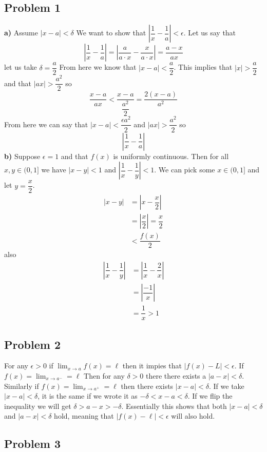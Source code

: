 \documentclass[12pt]{article}
\begin{document}
\subsection*{Problem 1}
\textbf{a)} Assume $|x - a| < \delta$ We want to show that $\left|\dfrac{1}{x} - \dfrac{1}{a} \right| < \epsilon$. Let us say that
\[ \left|\dfrac{1}{x} - \dfrac{1}{a} \right| = \left|\dfrac{a}{a \cdot x} - \dfrac{x}{a \cdot x} \right| = \dfrac{a - x}{ax} \]
let us take $\delta = \dfrac{a}{2}$ From here we know that $|x - a| < \dfrac{a}{2}$. This implies that $|x| > \dfrac{a}{2}$ and that $|ax| > \dfrac{a^2}{2}$ so
\[  \dfrac{x-a}{ax} < \dfrac{x - a}{\dfrac{a^2}{2}} = \dfrac{2(x - a)}{a^2}\]
From here we can say that $|x- a| < \dfrac{\epsilon a^2}{2}$ and $|ax| > \dfrac{a^2}{2}$ so
\[ \left|  \dfrac{1}{x} - \dfrac{1}{a} \right| \]
\textbf{b) } Suppose $\epsilon = 1$ and that $f(x)$ is uniformly continuous. Then for all $x,y \in (0,1]$ we have $|x-y| < 1$ and $|\dfrac{1}{x} - \dfrac{1}{y}| < 1$. We can pick some $x \in (0,1]$ and let $y= \dfrac{x}{2}$.
\begin{align*}
|x-y| &= \left |x - \dfrac{x}{2}\right |\\
&= \left |\dfrac{x}{2}\right | = \dfrac{x}{2} \\
&< \dfrac{f(x)}{2}
\end{align*}
also 
\begin{align*}
\left|\dfrac{1}{x} - \dfrac{1}{y} \right| &= \left|\dfrac{1}{x} - \dfrac{2}{x} \right|\\
&= \left |\dfrac{-1}{x}\right |\\
&= \dfrac{1}{x} > 1
\end{align*}
\subsection*{Problem 2}
For any $\epsilon > 0$ if $\lim_{x \to a}f(x) = \ell$ then it impies that $|f(x) - L| < \epsilon$. If $f(x) = \lim_{x \to a^-} = \ell$ Then for any $\delta > 0$ there there exists a $|a-x| < \delta$. Similarly if $f(x) = \lim_{x \to a^+} = \ell$ then there exists $|x - a| < \delta$. If we take $|x - a| < \delta$, it is the same if we wrote it as $-\delta < x - a < \delta$. If we flip the inequality we will get $\delta > a - x > -\delta$. Essentially this shows that both $|x-a| < \delta$ and $|a - x| < \delta$ hold, meaning that $|f(x) - \ell| < \epsilon$ will also hold.
\newpage
\subsection*{Problem 3}
\end{document}
